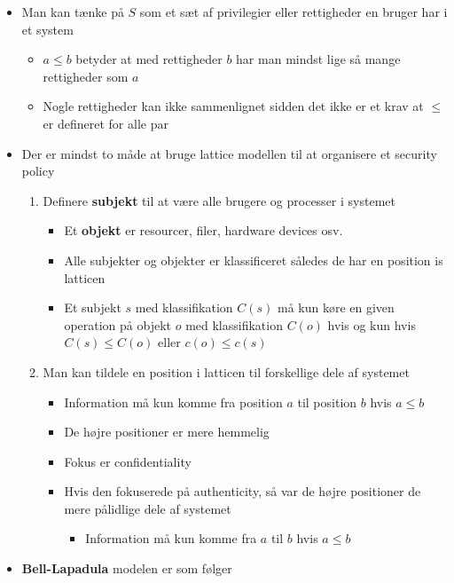 \documentclass[a4, english]{article}
\begin{document}
\begin{itemize}
\begin{itemize}
\begin{itemize}
    \end{itemize}
  \end{itemize}
  \item Man kan tænke på $S$ som et sæt af privilegier eller rettigheder en bruger har i et system 
  \begin{itemize}
  	\item $a \leq b$ betyder at med rettigheder $b$ har man mindst lige så mange rettigheder som $a$ 
    \item Nogle rettigheder kan ikke sammenlignet sidden det ikke er et krav at $\leq$ er defineret for alle par 
  \end{itemize}
  \item Der er mindst to måde at bruge lattice modellen til at organisere et security policy 
  \begin{enumerate}
  	\item Definere \textbf{subjekt} til at være alle brugere og processer i systemet 
    \begin{itemize}
    	\item Et \textbf{objekt} er resourcer, filer, hardware devices osv.
      \item Alle subjekter og objekter er klassificeret således de har en position is latticen  
      \item Et subjekt $s$ med klassifikation $C(s)$ må kun køre en given operation på objekt $o$ med klassifikation $C(o)$ hvis og kun hvis $C(s) \leq C(o)$ eller $c(o) \leq c(s)$ 
    \end{itemize}
    \item Man kan tildele en position i latticen til forskellige dele af systemet 
    \begin{itemize}
    	\item Information må kun komme fra position $a$ til position $b$ hvis $a \leq b$ 
      \item De højre positioner er mere hemmelig
      \item Fokus er confidentiality
      \item Hvis den fokuserede på authenticity, så var de højre positioner de mere pålidlige dele af systemet
      \begin{itemize}
      	\item Information må kun komme fra $a$ til $b$ hvis $a \leq b$ 
      \end{itemize}
    \end{itemize}
  \end{enumerate}  
  \item \textbf{Bell-Lapadula} modelen er som følger

\end{itemize}
\end{document}
